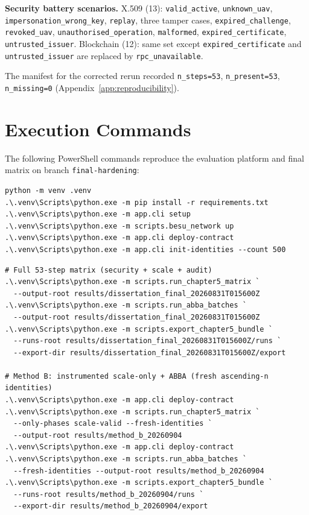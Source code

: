 \textbf{Security battery scenarios.}
X.509 (13): \texttt{valid\_active}, \texttt{unknown\_uav}, \texttt{impersonation\_wrong\_key}, \texttt{replay}, three tamper cases, \texttt{expired\_challenge}, \texttt{revoked\_uav}, \texttt{unauthorised\_operation}, \texttt{malformed}, \texttt{expired\_certificate}, \texttt{untrusted\_issuer}.
Blockchain (12): same set except \texttt{expired\_certificate} and \texttt{untrusted\_issuer} are replaced by \texttt{rpc\_unavailable}.

The manifest for the corrected rerun recorded \texttt{n\_steps=53}, \texttt{n\_present=53}, \texttt{n\_missing=0} (Appendix~\ref{app:reproducibility}).

\section{Execution Commands}
\label{app:commands}

The following PowerShell commands reproduce the evaluation platform and final matrix on branch \texttt{final-hardening}:

\begin{lstlisting}[style=powershell,caption={Environment setup and Besu deployment},label=lst:cmd-setup]
python -m venv .venv
.\.venv\Scripts\python.exe -m pip install -r requirements.txt
.\.venv\Scripts\python.exe -m app.cli setup
.\.venv\Scripts\python.exe -m scripts.besu_network up
.\.venv\Scripts\python.exe -m app.cli deploy-contract
.\.venv\Scripts\python.exe -m app.cli init-identities --count 500
\end{lstlisting}

\begin{lstlisting}[style=powershell,caption={Chapter~5 matrix, ABBA batches and export},label=lst:cmd-matrix]
# Full 53-step matrix (security + scale + audit)
.\.venv\Scripts\python.exe -m scripts.run_chapter5_matrix `
  --output-root results/dissertation_final_20260831T015600Z
.\.venv\Scripts\python.exe -m scripts.run_abba_batches `
  --output-root results/dissertation_final_20260831T015600Z
.\.venv\Scripts\python.exe -m scripts.export_chapter5_bundle `
  --runs-root results/dissertation_final_20260831T015600Z/runs `
  --export-dir results/dissertation_final_20260831T015600Z/export

# Method B: instrumented scale-only + ABBA (fresh ascending-n identities)
.\.venv\Scripts\python.exe -m app.cli deploy-contract
.\.venv\Scripts\python.exe -m scripts.run_chapter5_matrix `
  --only-phases scale-valid --fresh-identities `
  --output-root results/method_b_20260904
.\.venv\Scripts\python.exe -m app.cli deploy-contract
.\.venv\Scripts\python.exe -m scripts.run_abba_batches `
  --fresh-identities --output-root results/method_b_20260904
.\.venv\Scripts\python.exe -m scripts.export_chapter5_bundle `
  --runs-root results/method_b_20260904/runs `
  --export-dir results/method_b_20260904/export
\end{lstlisting}

